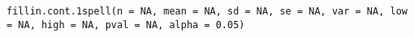 \begin{Usage}
\begin{verbatim}
fillin.cont.1spell(n = NA, mean = NA, sd = NA, se = NA, var = NA, low = NA, high = NA, pval = NA, alpha = 0.05)
\end{verbatim}
\end{Usage}
\begin{Arguments}
\begin{ldescription}
\item[\code{n}] 
\item[\code{mean}] 
\item[\code{sd}] 
\item[\code{se}] 
\item[\code{var}] 
\item[\code{low}] 
\item[\code{high}] 
\item[\code{pval}] 
\item[\code{alpha}] 
\end{ldescription}
\end{Arguments}
